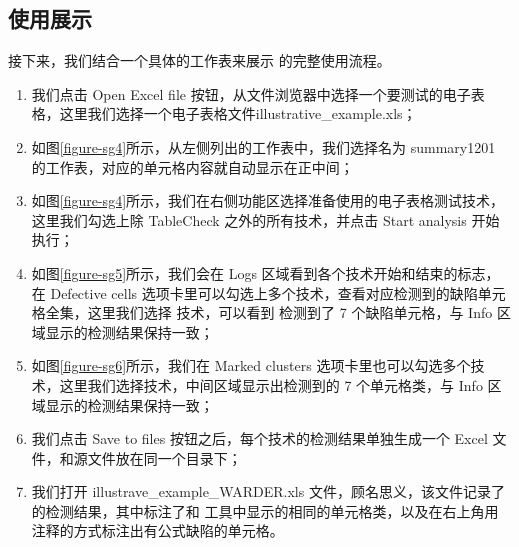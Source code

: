 \subsection{使用展示}
接下来，我们结合一个具体的工作表来展示 \sg 的完整使用流程。

\begin{enumerate}
    \item 我们点击 Open Excel file 按钮，从文件浏览器中选择一个要测试的电子表格，这里我们选择一个电子表格文件illustrative\_example.xls；
    
    \item 如图\ref{figure-sg4}所示，从左侧列出的工作表中，我们选择名为 summary1201 的工作表，对应的单元格内容就自动显示在正中间；
    
    \item 如图\ref{figure-sg4}所示，我们在右侧功能区选择准备使用的电子表格测试技术，这里我们勾选上除 TableCheck 之外的所有技术，并点击 Start analysis 开始执行；
    
    \item 如图\ref{figure-sg5}所示，我们会在 Logs 区域看到各个技术开始和结束的标志，在 Defective cells 选项卡里可以勾选上多个技术，查看对应检测到的缺陷单元格全集，这里我们选择 \wa 技术，可以看到 \wa 检测到了 7 个缺陷单元格，与 Info 区域显示的检测结果保持一致；
    
    \item 如图\ref{figure-sg6}所示，我们在 Marked clusters 选项卡里也可以勾选多个技术，这里我们选择\wa 技术，中间区域显示出\wa 检测到的 7 个单元格类，与 Info 区域显示的检测结果保持一致；
    
    \item 我们点击 Save to files 按钮之后，每个技术的检测结果单独生成一个 Excel 文件，和源文件放在同一个目录下；
    
    \item 我们打开 illustrave\_example\_WARDER.xls 文件，顾名思义，该文件记录了 \wa 的检测结果，其中标注了和 \sg 工具中显示的相同的单元格类，以及在右上角用注释的方式标注出有公式缺陷的单元格。
\end{enumerate}